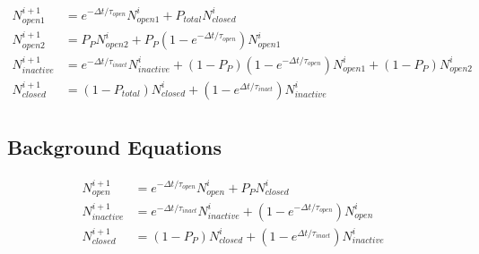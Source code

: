 \documentclass[12pt]{amsart}
\newcommand{\pr}[1]{\left(#1\right)}
\begin{document}
\begin{equation} \label{eq8}
\begin{split}
N_{open1}^{i+1} &=  e^{-\Delta t / \tau_{open}}N_{open1}^{i} + P_{total}N_{closed}^{i} \\ 
N_{open2}^{i+1} &= P_{P}N_{open2}^{i} + P_{P}\pr{1-e^{-\Delta t / \tau_{open}}}N_{open1}^{i} \\ 
N_{inactive}^{i+1} &= e^{-\Delta t / \tau_{inact}}N_{inactive}^{i} + \pr{1-P_{P}}\pr{1-e^{-\Delta t / \tau_{open}}}N_{open1}^{i} + \pr{1-P_P}N_{open2}^{i}\\
N_{closed}^{i+1} &= \pr{1 - P_{total}}N_{closed}^{i} + \pr{1-e^{\Delta t / \tau_{inact}}}N_{inactive}^{i} \\
\end{split}
\end{equation}

\subsection{Background Equations}

\begin{center}
\end{center}

\begin{equation} \label{eq8}
\begin{split}
N_{open}^{i+1} &=  e^{-\Delta t / \tau_{open}}N_{open}^{i} + P_{P}N_{closed}^{i} \\ 
N_{inactive}^{i+1} &= e^{-\Delta t / \tau_{inact}}N_{inactive}^{i} + \pr{1-e^{-\Delta t / \tau_{open}}}N_{open}^{i}\\
N_{closed}^{i+1} &= \pr{1 - P_{P}}N_{closed}^{i} + \pr{1-e^{\Delta t / \tau_{inact}}}N_{inactive}^{i} \\
\end{split}
\end{equation}
\end{document}
